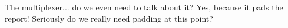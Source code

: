The multiplexer... do we even need to talk about it? Yes, because it pads the report!
Seriously do we really need padding at this point?


